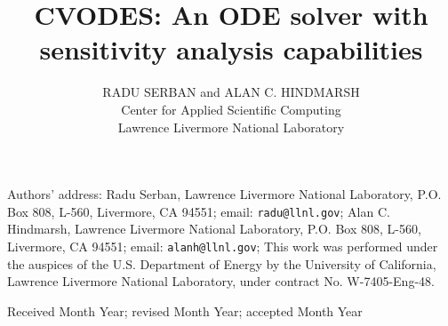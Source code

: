\documentclass[acmtoms]{acmtrans2m}
\title{CVODES: An ODE solver with sensitivity analysis capabilities}
\author{RADU SERBAN and ALAN C. HINDMARSH \\
  Center for Applied Scientific Computing \\
  Lawrence Livermore National Laboratory}
\begin{document}
\setcounter{page}{1}

\begin{bottomstuff}
Authors' address: 
Radu Serban, 
Lawrence Livermore National Laboratory, P.O. Box 808, L-560,
Livermore, CA 94551; email: {\tt radu@llnl.gov};
Alan C. Hindmarsh,
Lawrence Livermore National Laboratory, P.O. Box 808, L-560,
Livermore, CA 94551; email: {\tt alanh@llnl.gov};
\newline
This work was performed under the auspices of the
U.S. Department of Energy by the University of California,
Lawrence Livermore National Laboratory, under contract No.
W-7405-Eng-48.
\end{bottomstuff}

\maketitle












\begin{received}
Received Month Year;
revised Month Year; accepted Month Year
\end{received}
\end{document}
